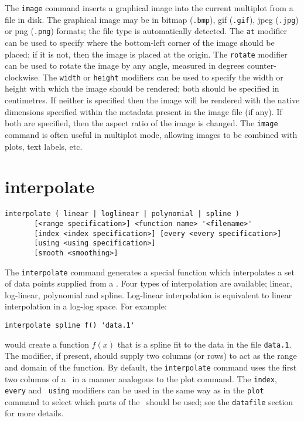 The {\tt image} command inserts a graphical image into the current multiplot
from a file in disk.  The graphical image may be in bitmap ({\tt .bmp}), gif
({\tt .gif}), jpeg ({\tt .jpg}) or png ({\tt .png}) formats; the file type is
automatically detected. The {\tt at} modifier can be used to specify where the
bottom-left corner of the image should be placed; if it is not, then the image
is placed at the origin. The {\tt rotate} modifier can be used to rotate the
image by any angle, measured in degrees counter-clockwise.  The {\tt width} or
{\tt height} modifiers can be used to specify the width or height with which
the image should be rendered; both should be specified in centimetres. If
neither is specified then the image will be rendered with the native dimensions
specified within the metadata present in the image file (if any). If both are
specified, then the aspect ratio of the image is changed. The {\tt image}
command is often useful in multiplot mode, allowing images to be combined with
plots, text labels, etc.


\section{interpolate}

\begin{verbatim}
interpolate ( linear | loglinear | polynomial | spline )
       [<range specification>] <function name> '<filename>'
       [index <index specification>] [every <every specification>]
       [using <using specification>]
       [smooth <smoothing>]
\end{verbatim}

The {\tt interpolate} command generates a special function which interpolates a
set of data points supplied from a \datafile.  Four types of interpolation are available; linear, log-linear,
polynomial and spline.  Log-linear interpolation is equivalent to linear
interpolation in a log-log space.  For example:

\begin{verbatim}
interpolate spline f() 'data.1'
\end{verbatim}

\noindent would create a function $f(x)$ that is a spline fit to the data in the
file {\tt data.1}. The  modifier, if present, should supply two
columns (or rows) to act as the range and domain of the function.  By default,
the {\tt interpolate} command uses the first two columns of a \datafile\ in a
manner analogous to the plot command. The {\tt index}, {\tt every} and {\tt
using} modifiers can be used in the same way as in the {\tt plot} command to
select which parts of the \datafile\ should be used; see the {\tt datafile}
section for more details.

